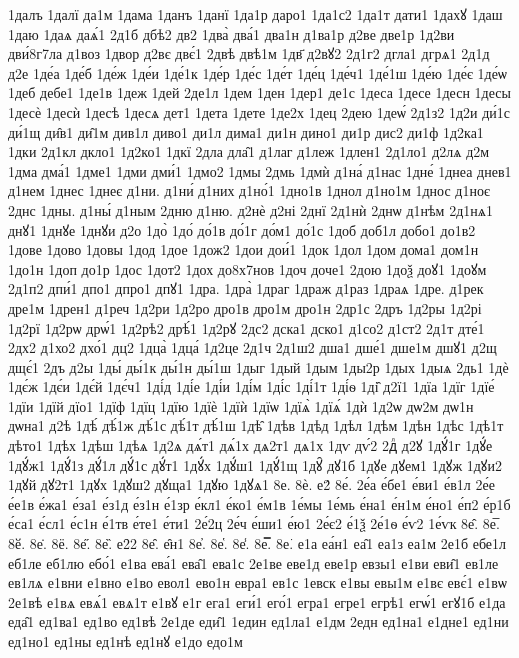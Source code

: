 {1далъ
1далї
да1м
1дама
1данъ
1данї
1да1р
даро1
1да1с2
1да1т
дати1
1дахꙋ
1даш
1даю
1даѧ
даѧ́1
2д1б
дбѣ2
дв2
1два̀
два́1
два1н
д1ва1р
д2ве
две1р
1д2ви
дви́8г7ла
д1воз
1двор
д2вє
двє́1
2двѣ
двѣ1м
1дв҃
д2вꙋ2
2д1г2
дгла1
дгрѧ1
2д1д
д2е
1де́а
1де́б
1де́ж
1де́и
1де́1к
1де́р
1де́с
1де́т
1де́ц
1де́ч1
1де́1ш
1де́ю
1де́є
1де́ѡ
1деб
дебе1
1де1в
1деж
1дей
2де1л
1дем
1ден
1дер1
де1с
1деса
1десе
1десн
1десы
1десѐ
1десѝ
1десѣ
1десѧ
дет1
1дета
1дете
1де2х
1дец
2дею
1деѡ́
2д1з2
1д2и
ди́1с
ди́1щ
ди̑в1
ди̑1м
див1л
диво1
ди1л
дима1
ди1н
дино1
ди1р
дис2
ди1ф
1д2ка1
1дки
2д1кл
дкло1
1д2ко1
1дкї
2дла
дла̑1
д1лаг
д1леж
1длен1
2д1ло1
д2лѧ
д2м
1дма
дма́1
1дме1
1дми
дми́1
1дмо2
1дмы
2дмь
1дмѝ
д1на́
д1нас
1дне́
1днеа
днев1
д1нем
1днес
1днеє
д1ни.
д1ни́
д1них
д1но́1
1дно1в
1днол
д1но1м
1днос
д1ноє
2днс
1дны.
д1ны́
д1ным
2дню
д1ню.
д2нѐ
д2ні
2днї
2д1нѝ
2днѡ
д1нѣм
2д1нѧ1
днꙋ1
1днꙋе
1днꙋи
д2о
1до̀
1до́
до́1в
до́1г
до́м1
до́1с
1доб
доб1л
добо1
до1в2
1дове
1дово
1довы
1дод
1дое
1дож2
1дои
дои́1
1док
1дол
1дом
дома1
дом1н
1до1н
1доп
до1р
1дос
1дот2
1дох
до8х7нов
1доч
доче1
2дою
1доѯ
доꙋ1
1доꙋм
2д1п2
дпи́1
дпо1
дпро1
дпꙋ1
1дра.
1дра̀
1драг
1драж
д1раз
1драѧ
1дре.
д1рек
дре1м
1дрен1
д1реч
1д2ри
1д2ро
дро1в
дро1м
дро1н
2др1с
2дръ
1д2ры
1д2рі
1д2рї
1д2рѡ
дрѡ́1
1д2рѣ2
дрѣ́1
1д2рꙋ
2дс2
дска1
дско1
д1со2
д1ст2
2д1т
дте́1
2дх2
д1хо2
дхо́1
дц2
1дца̀
1дца́
1д2це
2д1ч
2д1ш2
дша1
дше́1
дше1м
дшꙋ1
д2щ
дщє́1
2дъ
д2ы
1ды́
ды́1к
ды́1н
ды́1ш
1дыг
1дый
1дым
1ды2р
1дых
1дыѧ
2дь1
1дѐ
1дє́ж
1дє́и
1дє́й
1дє́ч1
1ді́д
1ді́е
1ді́и
1ді́м
1ді́с
1ді́1т
1ді́ѳ
1ді̑
д2ї1
1дїа
1дїг
1дїе́
1дїи
1дїй
дїо1
1дїф
1дїц
1дїю
1дїѐ
1дїѝ
1дїѡ
1дїѧ̀
1дїѧ́
1дѝ
1д2ѡ
дѡ2м
дѡ1н
дѡна1
д2ѣ
1дѣ́
дѣ́1ж
дѣ́1с
дѣ́1т
дѣ́1ш
1дѣ̑
1дѣв
1дѣд
1дѣл
1дѣм
1дѣн
1дѣс
1дѣ1т
дѣто1
1дѣх
1дѣш
1дѣѧ
1д2ѧ
дѧ́т1
дѧ́1х
дѧ2т1
дѧ1х
1дѵ
дѵ́2
2дⷧ
д2ꙋ
1дꙋ́1г
1дꙋ́е
1дꙋ́ж1
1дꙋ́1з
дꙋ́1л
дꙋ́1с
дꙋ́т1
1дꙋ́х
1дꙋ́ш1
1дꙋ́1щ
1дꙋ̑
дꙋ1б
1дꙋе
дꙋем1
1дꙋж
1дꙋи2
1дꙋй
дꙋ2т1
1дꙋх
1дꙋш2
дꙋща1
1дꙋю
1дꙋѧ1
8е.
8ѐ.
е2́
8е́.
2е́а
е́бе1
е́ви1
е́в1л
2е́е
е́е1в
е́жа1
е́за1
е́з1д
е́з1н
е́1зр
е́кл1
е́ко1
е́м1в
1е́мы
1е́мь
е́на1
е́н1м
е́но1
е́п2
е́р1б
е́са1
е́сл1
е́с1н
е́1тв
е́те1
е́ти1
2е́2ц
2е́ч
е́ши1
е́ю1
2е́є2
е́1ѯ
2е́1ѳ
е́ѵ2
1е́ѵк
8е̂.
8е̅.
8ӗ.
8е̇.
8ё.
8е̋.
8е̏.
е2̑2
8е̑.
е̑н1
8е̓.
8е̔.
8е̾.
8е̿.
8е͘.
е1а
еа́н1
еа̑1
еа1з
еа1м
2е1б
ебе1л
еб1ле
еб1лю
ебо́1
е1ва
ева́1
ева̑1
ева1с
2е1ве
еве1д
еве1р
евзы1
е1ви
еви̑1
ев1ле
ев1лѧ
е1вни
е1вно
е1во
евол1
ево1н
евра1
ев1с
1евск
е1вы
евы1м
е1вє
евє́1
е1вѡ
2е1вѣ
е1вѧ
евѧ́1
евѧ1т
е1вꙋ
е1г
ега1
еги́1
его́1
егра1
егре1
егрѣ1
егѡ́1
егꙋ1б
е1да
еда̑1
ед1ва1
ед1во
ед1вѣ
2е1де
еди̑1
1един
ед1ла1
е1дм
2едн
ед1на1
е1дне1
ед1ни
ед1но1
ед1ны
ед1нѣ
ед1нꙋ
е1до
едо1м
}

